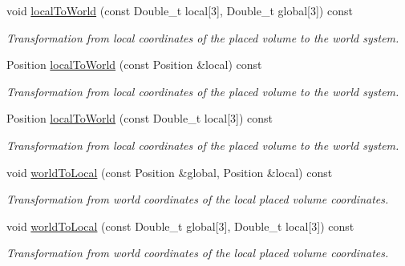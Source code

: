 \begin{DoxyCompactItemize}
void \hyperlink{class_d_d4hep_1_1_alignments_1_1_alignment_data_ae0c2e7c631c7af81c54a4f75317120aa}{localToWorld} (const Double\_\-t local\mbox{[}3\mbox{]}, Double\_\-t global\mbox{[}3\mbox{]}) const 
\begin{DoxyCompactList}\small\item\em Transformation from local coordinates of the placed volume to the world system. \item\end{DoxyCompactList}\item 
Position \hyperlink{class_d_d4hep_1_1_alignments_1_1_alignment_data_abd5ea2c3e08f510fb326a97eb3ec16bd}{localToWorld} (const Position \&local) const 
\begin{DoxyCompactList}\small\item\em Transformation from local coordinates of the placed volume to the world system. \item\end{DoxyCompactList}\item 
Position \hyperlink{class_d_d4hep_1_1_alignments_1_1_alignment_data_a9822d4b558f7c72aabf02ed2af16d2fb}{localToWorld} (const Double\_\-t local\mbox{[}3\mbox{]}) const 
\begin{DoxyCompactList}\small\item\em Transformation from local coordinates of the placed volume to the world system. \item\end{DoxyCompactList}\item 
void \hyperlink{class_d_d4hep_1_1_alignments_1_1_alignment_data_affd38849676e68e49f5455b003d0e9ad}{worldToLocal} (const Position \&global, Position \&local) const 
\begin{DoxyCompactList}\small\item\em Transformation from world coordinates of the local placed volume coordinates. \item\end{DoxyCompactList}\item 
void \hyperlink{class_d_d4hep_1_1_alignments_1_1_alignment_data_aebb62803c8bd116274744701317271a5}{worldToLocal} (const Double\_\-t global\mbox{[}3\mbox{]}, Double\_\-t local\mbox{[}3\mbox{]}) const 
\begin{DoxyCompactList}\small\item\em Transformation from world coordinates of the local placed volume coordinates. \item\end{DoxyCompactList}\item 

\end{DoxyCompactItemize}
